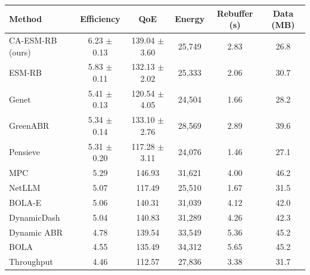 \begin{tabular}{lccccc}
\toprule
Method & Efficiency & QoE & Energy & Rebuffer (s) & Data (MB)\\
\midrule
CA-ESM-RB (ours) & 6.23 $\pm$ 0.13 & 139.04 $\pm$ 3.60 & 25,749 & 2.83 & 26.8\\
ESM-RB & 5.83 $\pm$ 0.11 & 132.13 $\pm$ 2.02 & 25,333 & 2.06 & 30.7\\
Genet & 5.41 $\pm$ 0.13 & 120.54 $\pm$ 4.05 & 24,504 & 1.66 & 28.2\\
GreenABR & 5.34 $\pm$ 0.14 & 133.10 $\pm$ 2.76 & 28,569 & 2.89 & 39.6\\
Pensieve & 5.31 $\pm$ 0.20 & 117.28 $\pm$ 3.11 & 24,076 & 1.46 & 27.1\\
MPC & 5.29 & 146.93 & 31,621 & 4.00 & 46.2\\
NetLLM & 5.07 & 117.49 & 25,510 & 1.67 & 31.5\\
BOLA-E & 5.06 & 140.31 & 31,039 & 4.12 & 42.0\\
DynamicDash & 5.04 & 140.83 & 31,289 & 4.26 & 42.3\\
Dynamic ABR & 4.78 & 139.54 & 33,549 & 5.36 & 45.2\\
BOLA & 4.55 & 135.49 & 34,312 & 5.65 & 45.2\\
Throughput & 4.46 & 112.57 & 27,836 & 3.38 & 31.7\\
\bottomrule
\end{tabular}
